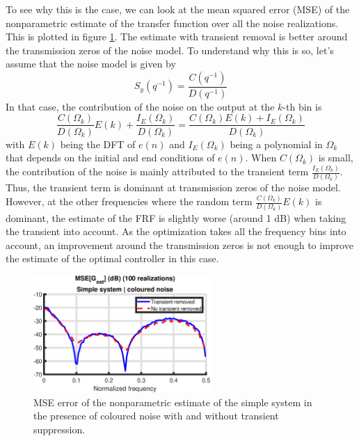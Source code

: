 To see why this is the case, we can look at the mean squared error (MSE) of the nonparametric estimate of the transfer function over all the noise realizations. This is plotted in figure \ref{fig:MSE_Gest_simple_coloured}. The estimate with transient removal is better around the transmission zeros of the noise model. To understand why this is so, let's assume that the noise model is given by
\begin{equation*}
	S_y(q^{-1}) = \frac{C(q^{-1})}{D(q^{-1})}
\end{equation*}
In that case, the contribution of the noise on the output at the $k$-th bin is
\begin{equation*}
	\frac{C(\Omega_k)}{D(\Omega_k)} E(k) + \frac{I_E(\Omega_k)}{D(\Omega_k)} = \frac{C(\Omega_k) E(k) + I_E(\Omega_k)}{D(\Omega_k)}
\end{equation*}
with $E(k)$ being the DFT of $e(n)$ and $I_E(\Omega_k)$ being a polynomial in $\Omega_k$ that depends on the initial and end conditions of $e(n)$. When $C(\Omega_k)$ is small, the contribution of the noise is mainly attributed to the transient term $\frac{I_E(\Omega_k)}{D(\Omega_k)}$. Thus, the transient term is dominant at transmission zeros of the noise model. However, at the other frequencies where the random term $\frac{C(\Omega_k)}{D(\Omega_k)} E(k)$ is dominant, the estimate of the FRF is slightly worse (around 1 dB) when taking the transient into account. As the optimization takes all the frequency bins into account, an improvement around the transmission zeros is not enough to improve the estimate of the optimal controller in this case.

\begin{figure}[H]
\centering
\includegraphics[width=0.6\textwidth]{figures/MSE_Gest_simple_coloured.eps}
\caption{MSE error of the nonparametric estimate of the simple system in the presence of coloured noise with and without transient suppression.}
\label{fig:MSE_Gest_simple_coloured}
\end{figure}

